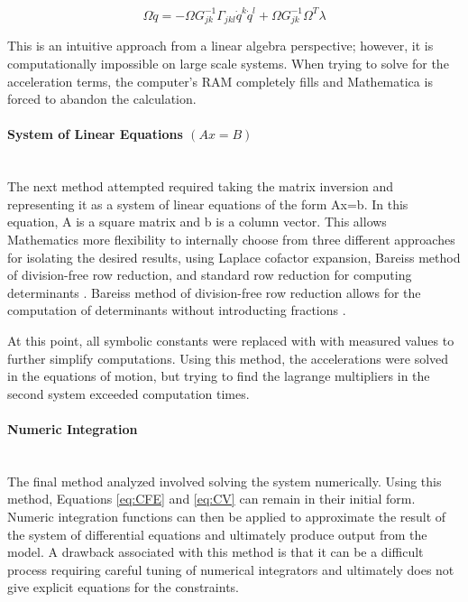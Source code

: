 \begin{equation}
\label{eq:SMI}
\Omega \ddot{q} = -\Omega G_{jk}^{-1}\Gamma_{jkl} \dot{q}^k\dot{q}^l + \Omega G_{jk}^{-1} \Omega ^T \lambda
\end{equation}

This is an intuitive approach from a linear algebra perspective; however, it is computationally impossible on large scale systems. 
When trying to solve for the acceleration terms, the computer's RAM completely fills and Mathematica is forced to abandon the calculation.

\paragraph{System of Linear Equations $(Ax=B)$}\mbox{}\\
The next method attempted required taking the matrix inversion and representing it as a system of linear equations of the form Ax=b. 
In this equation, A is a square matrix and b is a column vector.
This allows Mathematics more flexibility to internally choose from three different approaches for isolating the desired results, using Laplace cofactor expansion, Bareiss method of division-free row reduction, and standard row reduction for computing determinants \cite{linearsolve}.
Bareiss method of division-free row reduction allows for the computation of determinants without introducting fractions \cite{bareiss}.
\par
At this point, all symbolic constants were replaced with with measured values to further simplify computations.
Using this method, the accelerations were solved in the equations of motion, but trying to find the lagrange multipliers in the second system exceeded computation times.

\paragraph{Numeric Integration}\mbox{}\\
The final method analyzed involved solving the system numerically.
Using this method, Equations \ref{eq:CFE} and \ref{eq:CV} can remain in their initial form.
Numeric integration functions can then be applied to approximate the result of the system of differential equations and ultimately produce output from the model.
A drawback associated with this method is that it can be a difficult process requiring careful tuning of numerical integrators and ultimately does not give explicit equations for the constraints.

